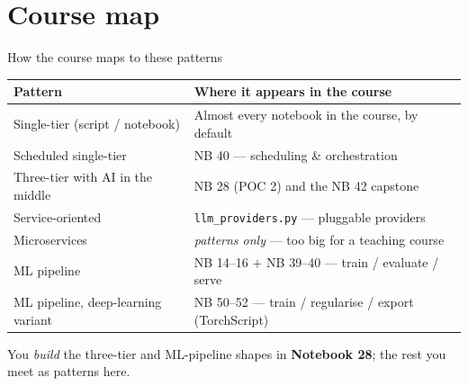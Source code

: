 \documentclass[aspectratio=169,11pt]{beamer}
\begin{document}
\section{Course map}
\begin{frame}{How the course maps to these patterns}
  \small
  \begin{center}
  \begin{tabular}{ll}
    \toprule
    \textbf{Pattern} & \textbf{Where it appears in the course} \\
    \midrule
    Single-tier (script / notebook) & Almost every notebook in the course, by default \\
    Scheduled single-tier           & NB 40 --- scheduling \& orchestration \\
    Three-tier with AI in the middle& NB 28 (POC 2) and the NB 42 capstone \\
    Service-oriented                & \texttt{llm\_providers.py} --- pluggable providers \\
    Microservices                   & \emph{patterns only} --- too big for a teaching course \\
    ML pipeline                     & NB 14--16 $+$ NB 39--40 --- train / evaluate / serve \\
    ML pipeline, deep-learning variant & NB 50--52 --- train / regularise / export (TorchScript) \\
    \bottomrule
  \end{tabular}
  \end{center}
  \vspace{4pt}
  {\footnotesize You \emph{build} the three-tier and ML-pipeline shapes in \textbf{Notebook 28}; the rest you meet as patterns here.}
\end{frame}
\end{document}
